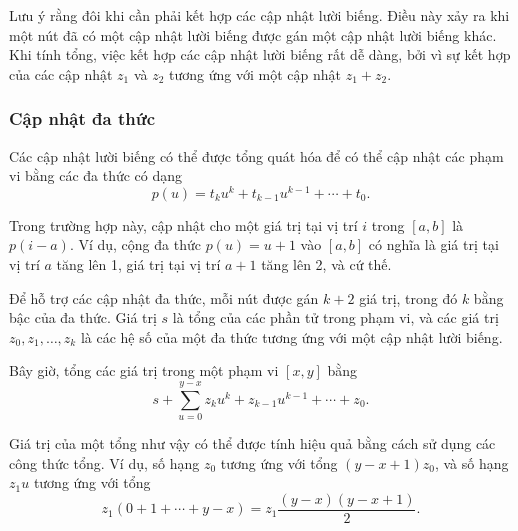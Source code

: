 \begin{center}
\end{center}

Lưu ý rằng đôi khi cần phải kết hợp các cập nhật lười biếng.
Điều này xảy ra khi một nút đã có một cập nhật lười biếng
được gán một cập nhật lười biếng khác.
Khi tính tổng, việc kết hợp các cập nhật lười biếng rất dễ dàng,
bởi vì sự kết hợp của các cập nhật $z_1$ và $z_2$
tương ứng với một cập nhật $z_1+z_2$.

\subsubsection{Cập nhật đa thức}

Các cập nhật lười biếng có thể được tổng quát hóa để có thể
cập nhật các phạm vi bằng các đa thức có dạng
\[p(u) = t_k u^k + t_{k-1} u^{k-1} + \cdots + t_0.\]

Trong trường hợp này, cập nhật cho một giá trị
tại vị trí $i$ trong $[a,b]$ là $p(i-a)$.
Ví dụ, cộng đa thức $p(u)=u+1$
vào $[a,b]$ có nghĩa là giá trị tại vị trí $a$
tăng lên 1, giá trị tại vị trí $a+1$
tăng lên 2, và cứ thế.

Để hỗ trợ các cập nhật đa thức,
mỗi nút được gán $k+2$ giá trị,
trong đó $k$ bằng bậc của đa thức.
Giá trị $s$ là tổng của các phần tử trong phạm vi,
và các giá trị $z_0,z_1,\ldots,z_k$ là các hệ số
của một đa thức tương ứng với một cập nhật lười biếng.

Bây giờ, tổng các giá trị trong một phạm vi $[x,y]$ bằng
\[s+\sum_{u=0}^{y-x} z_k u^k + z_{k-1} u^{k-1} + \cdots + z_0.\]

Giá trị của một tổng như vậy
có thể được tính hiệu quả bằng cách sử dụng các công thức tổng.
Ví dụ, số hạng $z_0$ tương ứng với tổng
$(y-x+1)z_0$, và số hạng $z_1 u$ tương ứng với tổng
\[z_1(0+1+\cdots+y-x) = z_1 \frac{(y-x)(y-x+1)}{2} .\]

